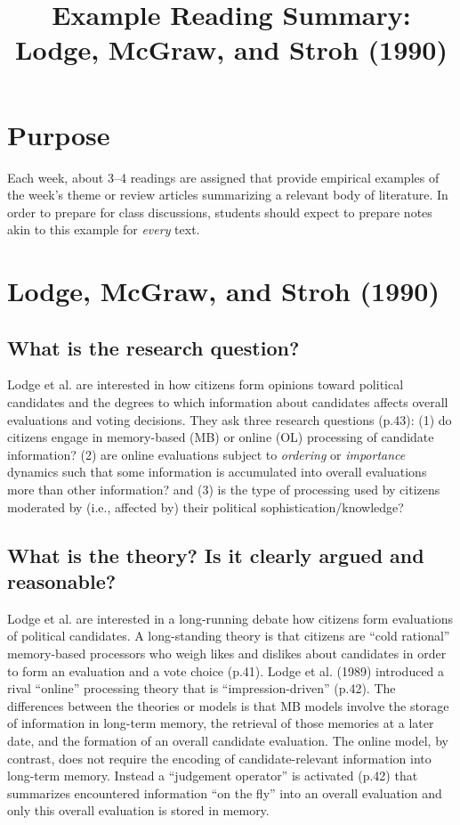 \documentclass[a4paper]{exam}
\title{Example Reading Summary: Lodge, McGraw, and Stroh (1990)}
\date{}
\begin{document}
\vspace{-4em}
\maketitle
\vspace{-4em}

\section{Purpose}\label{purpose}

Each week, about 3--4 readings are assigned that provide empirical examples of the week's theme or review articles summarizing a relevant body of literature. In order to prepare for class discussions, students should expect to prepare notes akin to this example for \textit{every} text.

\section{Lodge, McGraw, and Stroh (1990)}\label{overview}

\subsection{What is the research question?}

Lodge et al. are interested in how citizens form opinions toward political candidates and the degrees to which information about candidates affects overall evaluations and voting decisions. They ask three research questions (p.43): (1) do citizens engage in memory-based (MB) or online (OL) processing of candidate information? (2) are online evaluations subject to \textit{ordering} or \textit{importance} dynamics such that some information is accumulated into overall evaluations more than other information? and (3) is the type of processing used by citizens moderated by (i.e., affected by) their political sophistication/knowledge?

\subsection{What is the theory? Is it clearly argued and reasonable?}

Lodge et al. are interested in a long-running debate how citizens form evaluations of political candidates. A long-standing theory is that citizens are ``cold rational'' memory-based processors who weigh likes and dislikes about candidates in order to form an evaluation and a vote choice (p.41). Lodge et al. (1989) introduced a rival ``online'' processing theory that is ``impression-driven'' (p.42). The differences between the theories or models is that MB models involve the storage of information in long-term memory, the retrieval of those memories at a later date, and the formation of an overall candidate evaluation. The online model, by contrast, does not require the encoding of candidate-relevant information into long-term memory. Instead a ``judgement operator'' is activated (p.42) that summarizes encountered information ``on the fly'' into an overall evaluation and only this overall evaluation is stored in memory.
\end{document}
